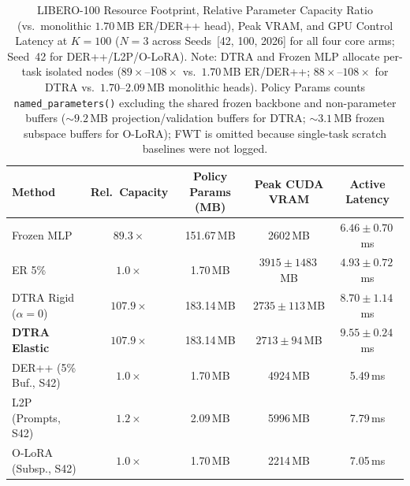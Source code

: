 \documentclass[10pt]{article}
\newcommand{\tblfont}{\fontsize{8.5pt}{10.4pt}\selectfont}
\begin{document}
\begin{table}[ht!]
  \centering
  \caption{LIBERO-100 Resource Footprint, Relative Parameter Capacity Ratio (vs.\ monolithic $1.70$\,MB ER/DER++ head), Peak VRAM, and GPU Control Latency at $K=100$ ($N=3$ across Seeds~[42, 100, 2026] for all four core arms; Seed~42 for DER++/L2P/O-LoRA). Note: DTRA and Frozen MLP allocate per-task isolated nodes ($89{\times}\text{--}108{\times}$ vs.\ $1.70$\,MB ER/DER++; $88{\times}\text{--}108{\times}$ for DTRA vs.\ $1.70\text{--}2.09$\,MB monolithic heads). Policy Params counts \texttt{named\_parameters()} excluding the shared frozen backbone and non-parameter buffers ($\sim 9.2$\,MB projection/validation buffers for DTRA; $\sim 3.1$\,MB frozen subspace buffers for O-LoRA); FWT is omitted because single-task scratch baselines were not logged.}
  \label{tab:libero_resources}
  \tblfont
  \setlength{\tabcolsep}{4.2pt}
  \begin{tabular}{lcccc}
    \toprule
    \textbf{Method} & \textbf{Rel.\ Capacity} & \textbf{Policy Params (MB)} & \textbf{Peak CUDA VRAM} & \textbf{Active Latency} \\
    \midrule
    Frozen MLP & $89.3{\times}$ & 151.67\,MB & 2602\,MB & $6.46 \pm 0.70$\,ms \\
    ER 5\% & $1.0{\times}$ & 1.70\,MB & $3915 \pm 1483$\,MB & $4.93 \pm 0.72$\,ms \\
    DTRA Rigid ($\alpha=0$) & $107.9{\times}$ & 183.14\,MB & $2735 \pm 113$\,MB & $8.70 \pm 1.14$\,ms \\
    \textbf{DTRA Elastic} & $107.9{\times}$ & 183.14\,MB & $2713 \pm 94$\,MB & $9.55 \pm 0.24$\,ms \\
    \midrule
    DER++ (5\% Buf., S42) & $1.0{\times}$ & 1.70\,MB & 4924\,MB & 5.49\,ms \\
    L2P (Prompts, S42) & $1.2{\times}$ & 2.09\,MB & 5996\,MB & 7.79\,ms \\
    O-LoRA (Subsp., S42) & $1.0{\times}$ & 1.70\,MB & 2214\,MB & 7.05\,ms \\
    \bottomrule
  \end{tabular}
\end{table}
\end{document}
